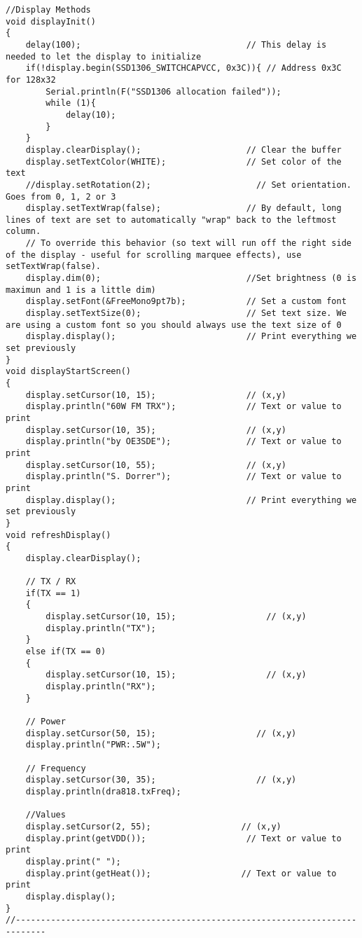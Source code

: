 \begin{lstlisting}[language=Arduino]
//Display Methods
void displayInit()
{
	delay(100);                                 // This delay is needed to let the display to initialize
	if(!display.begin(SSD1306_SWITCHCAPVCC, 0x3C)){ // Address 0x3C for 128x32
		Serial.println(F("SSD1306 allocation failed"));
		while (1){
			delay(10);
		}
	}
	display.clearDisplay();                     // Clear the buffer
	display.setTextColor(WHITE);                // Set color of the text
	//display.setRotation(2);                     // Set orientation. Goes from 0, 1, 2 or 3
	display.setTextWrap(false);                 // By default, long lines of text are set to automatically "wrap" back to the leftmost column. 
	// To override this behavior (so text will run off the right side of the display - useful for scrolling marquee effects), use setTextWrap(false).
	display.dim(0);                             //Set brightness (0 is maximun and 1 is a little dim)
	display.setFont(&FreeMono9pt7b);            // Set a custom font
	display.setTextSize(0);                     // Set text size. We are using a custom font so you should always use the text size of 0
	display.display();                          // Print everything we set previously
}
void displayStartScreen()
{
	display.setCursor(10, 15);                  // (x,y)
	display.println("60W FM TRX");              // Text or value to print
	display.setCursor(10, 35);                  // (x,y)
	display.println("by OE3SDE");               // Text or value to print
	display.setCursor(10, 55);                  // (x,y)
	display.println("S. Dorrer");               // Text or value to print
	display.display();                          // Print everything we set previously
}
void refreshDisplay()
{
	display.clearDisplay();
	
	// TX / RX
	if(TX == 1)
	{
		display.setCursor(10, 15);                  // (x,y)
		display.println("TX");
	}
	else if(TX == 0)
	{
		display.setCursor(10, 15);                  // (x,y)
		display.println("RX");
	}
	
	// Power
	display.setCursor(50, 15);                    // (x,y)
	display.println("PWR:.5W");
	
	// Frequency
	display.setCursor(30, 35);                    // (x,y)
	display.println(dra818.txFreq);
	
	//Values
	display.setCursor(2, 55);                  // (x,y)
	display.print(getVDD());                    // Text or value to print
	display.print(" ");
	display.print(getHeat());                  // Text or value to print  
	display.display();
}
//----------------------------------------------------------------------------


\end{lstlisting}
